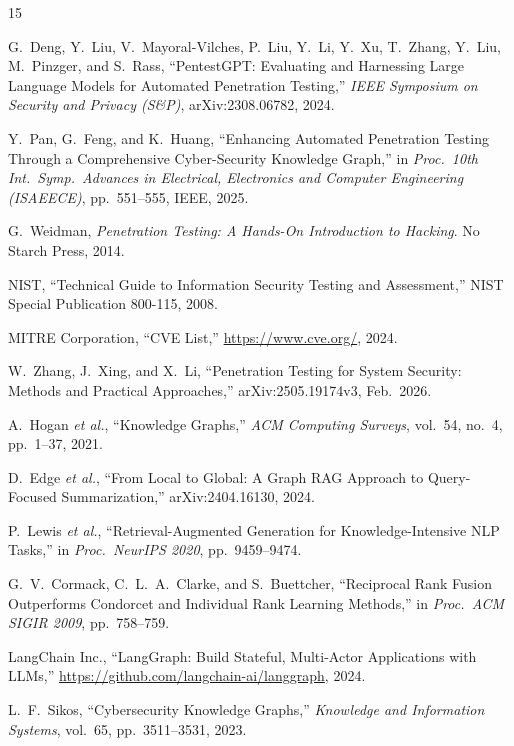 \documentclass[conference]{IEEEtran}
\begin{document}
\balance
\begin{thebibliography}{15}

G.~Deng, Y.~Liu, V.~Mayoral-Vilches, P.~Liu, Y.~Li, Y.~Xu, T.~Zhang,
Y.~Liu, M.~Pinzger, and S.~Rass,
``PentestGPT: Evaluating and Harnessing Large Language Models for Automated
Penetration Testing,''
\textit{IEEE Symposium on Security and Privacy (S\&P)}, arXiv:2308.06782, 2024.

Y.~Pan, G.~Feng, and K.~Huang,
``Enhancing Automated Penetration Testing Through a Comprehensive Cyber-Security
Knowledge Graph,''
in \textit{Proc.\ 10th Int.\ Symp.\ Advances in Electrical, Electronics and
Computer Engineering (ISAEECE)}, pp.~551--555, IEEE, 2025.

G.~Weidman,
\textit{Penetration Testing: A Hands-On Introduction to Hacking}.
No Starch Press, 2014.

NIST,
``Technical Guide to Information Security Testing and Assessment,''
NIST Special Publication 800-115, 2008.

MITRE Corporation, ``CVE List,'' \url{https://www.cve.org/}, 2024.

W.~Zhang, J.~Xing, and X.~Li,
``Penetration Testing for System Security: Methods and Practical Approaches,''
arXiv:2505.19174v3, Feb.\ 2026.

A.~Hogan \textit{et al.},
``Knowledge Graphs,''
\textit{ACM Computing Surveys}, vol.~54, no.~4, pp.~1--37, 2021.

D.~Edge \textit{et al.},
``From Local to Global: A Graph RAG Approach to Query-Focused Summarization,''
arXiv:2404.16130, 2024.

P.~Lewis \textit{et al.},
``Retrieval-Augmented Generation for Knowledge-Intensive NLP Tasks,''
in \textit{Proc.\ NeurIPS 2020}, pp.~9459--9474.

G.~V.~Cormack, C.~L.~A.~Clarke, and S.~Buettcher,
``Reciprocal Rank Fusion Outperforms Condorcet and Individual Rank Learning
Methods,''
in \textit{Proc.\ ACM SIGIR 2009}, pp.~758--759.

LangChain Inc.,
``LangGraph: Build Stateful, Multi-Actor Applications with LLMs,''
\url{https://github.com/langchain-ai/langgraph}, 2024.

L.~F.~Sikos,
``Cybersecurity Knowledge Graphs,''
\textit{Knowledge and Information Systems}, vol.~65, pp.~3511--3531, 2023.


\end{thebibliography}
\end{document}
